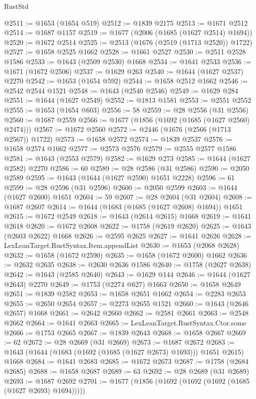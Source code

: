 \begin{lexlean}{RustStd}
\begin{coremodule}
@2511 := @1653 (@1654 @519)
@2512 := @1839 @2175
@2513 := @1671 @2512
@2514 := @1687 @1157
@2519 := @1677 (@2006 (@1685 (@1627 @2514) @1694))
@2520 := @1672 @2514
@2525 := @2513 (@1676 (@2519 (@1713 @2520)) @1722)
@2527 := @1658 @2525 @1662
@2528 := @1661 @2527
@2530 := @2511 @2528 @1586
@2533 := @1643 (@2509 @2530) @1668
@2534 := @1641 @2533
@2536 := @1671 (@1672 @2506)
@2537 := @1629 @263
@2540 := @1644 (@1627 @2537) @2270
@2542 := @1653 (@1654 @592)
@2544 := @1658 @2512 @1662
@2546 := @2542 @2544 @1521
@2548 := @1643 (@2540 @2546)
@2549 := @1629 @284
@2551 := @1644 (@1627 @2549)
@2552 := @1813 @1581
@2553 := @2551 @2552
@2555 := @1653 (@1654 @603)
@2556 := 58
@2559 := @28 @2556 (@31 @2556)
@2560 := @1687 @2559
@2566 := @1677 (@1856 (@1692 (@1685 (@1627 @2560) @2474)))
@2567 := @1672 @2560
@2572 := @2446 (@1676 (@2566 (@1713 @2567)) @1722)
@2573 := @1658 @2572
@2574 := @1839 @2537
@2576 := @1658 @2574 @1662
@2577 := @2573 @2576
@2579 := @2555 @2577 @1586
@2581 := @1643 (@2553 @2579)
@2582 := @1629 @273
@2585 := @1644 (@1627 @2582) @2270
@2586 := 60
@2589 := @28 @2586 (@31 @2586)
@2590 := @2050 @2589
@2595 := @1643 (@1644 (@1627 @2590) @1651 @2228)
@2596 := 61
@2599 := @28 @2596 (@31 @2596)
@2600 := @2050 @2599
@2603 := @1644 (@1627 @2600) @1651
@2604 := 59
@2607 := @28 @2604 (@31 @2604)
@2608 := @1687 @2607
@2614 := @1644 (@1683 (@1685 (@1627 @2608) @1694)) @1651
@2615 := @1672 @2549
@2618 := @1643 (@2614 @2615) @1668
@2619 := @1641 @2618
@2620 := @1672 @2608
@2622 := @1758 (@2619 @2620)
@2625 := @1643 (@2603 @2622) @1668
@2626 := @2595 @2625
@2627 := @1641 @2626
@2628 := LexLeanTarget.RustSyntax.Item.appendList
@2630 := @1653 (@2068 @2628)
@2632 := @1658 (@1672 @2590)
@2635 := @1658 (@1672 @2600) @1662
@2636 := @2632 @2635
@2638 := @2630 @2636 @1586
@2640 := @1758 (@2627 @2638)
@2642 := @1643 (@2585 @2640)
@2643 := @1629 @144
@2646 := @1644 (@1627 @2643) @2270
@2649 := @1753 (@2274 @627) @1663
@2650 := @1658 @2649
@2651 := @1839 @2582
@2653 := @1658 @2651 @1662
@2654 := @2283 @2653
@2655 := @2650 @2654
@2657 := @2273 @2655 @1521
@2660 := @1643 (@2646 @2657) @1668
@2661 := @2642 @2660
@2662 := @2581 @2661
@2663 := @2548 @2662
@2664 := @1641 @2663
@2665 := LexLeanTarget.RustSyntax.Ctor.some
@2666 := @1753 @2665
@2667 := @1839 @2643
@2668 := @1658 @2667
@2669 := 62
@2672 := @28 @2669 (@31 @2669)
@2673 := @1687 @2672
@2683 := @1643 (@1644 (@1683 (@1692 (@1685 (@1627 @2673) @1693))) @1651 @2615) @1668
@2684 := @1641 @2683
@2685 := @1672 @2673
@2687 := @1758 (@2684 @2685)
@2688 := @1658 @2687
@2689 := 63
@2692 := @28 @2689 (@31 @2689)
@2693 := @1687 @2692
@2701 := @1677 (@1856 (@1692 (@1692 (@1692 (@1685 (@1627 @2693) @1694)))))

\end{coremodule}
\end{lexlean}
